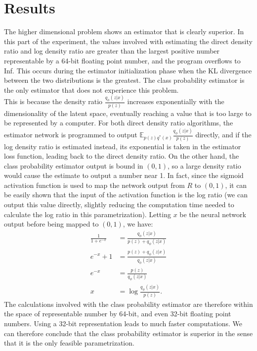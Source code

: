 \documentclass[honours,12pt]{unswthesis}
\newcommand{\E}{\mathbb{E}}
\numberwithin{equation}{section}
\theoremstyle{definition}
\begin{document}
\section{Results}
The higher dimensional problem shows an estimator that is clearly superior. In this part of the experiment, the values involved with estimating the direct density ratio and log density ratio are greater than the largest positive number representable by a 64-bit floating point number, and the program overflows to Inf. This occurs during the estimator initialization phase when the KL divergence between the two distributions is the greatest. The class probability estimator is the only estimator that does not experience this problem.\\
This is because the density ratio $\frac{q_\phi(z|x)}{p(z)}$ increases exponentially with the dimensionality of the latent space, eventually reaching a value that is too large to be represented by a computer. For both direct density ratio algorithms, the estimator network is programmed to output $\E_{p(z)q^*(x)}\frac{q_\phi(z|x)}{p(z)}$ directly, and if the log density ratio is estimated instead, its exponential is taken in the estimator loss function, leading back to the direct density ratio. On the other hand, the class probability estimator output is bound in $(0,1)$, so a large density ratio would cause the estimate to output a number near 1. In fact, since the sigmoid activation function is used to map the network output from $R$ to $(0,1)$, it can be easily shown that the input of the activation function is the log ratio (we can output this value directly, slightly reducing the computation time needed to calculate the log ratio in this parametrization). Letting $x$ be the neural network output before being mapped to $(0,1)$, we have:
\begin{align*}
\frac{1}{1+e^{-x}}&=\frac{q_\phi(z|x)}{p(z)+q_\phi(z|x)}\\
e^{-x}+1&=\frac{p(z)+q_\phi(z|x)}{q_\phi(z|x)}\\
e^{-x}&=\frac{p(z)}{q_\phi(z|x)}\\
x&=\log \frac{q_\phi(z|x)}{p(z)}.
\end{align*}
The calculations involved with the class probability estimator are therefore within the space of representable number by 64-bit, and even 32-bit floating point numbers. Using a 32-bit representation leads to much faster computations. We can therefore conclude that the class probability estimator is superior in the sense that it is the only feasible parametrization.
\end{document}
